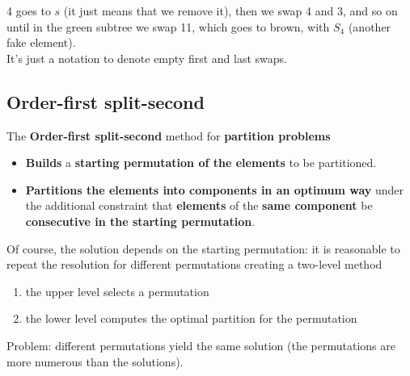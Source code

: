\documentclass[11pt]{article}
\begin{document}
	4 goes to $s$ (it just means that we remove it), then we swap 4 and 3, and so on until in the green subtree we swap 11, which goes to brown, with $S_4$ (another fake element).\\
	
	It's just a notation to denote empty first and last swaps.\\
	
	\newpage
	
	\subsection{Order-first split-second}
	
	The \textbf{Order-first split-second} method for \textbf{partition problems}
	\begin{itemize}
		\item \textbf{Builds} a \textbf{starting permutation of the elements} to be partitioned.\\
		
		\item \textbf{Partitions the elements into components in an optimum way} under the additional constraint that \textbf{elements} of the \textbf{same component} be \textbf{consecutive in the starting permutation}.\\
	\end{itemize}
	
	Of course, the solution depends on the starting permutation: it is reasonable to repeat the resolution for different permutations creating a two-level method
	\begin{enumerate}
		\item the upper level selects a permutation
		
		\item the lower level computes the optimal partition for the permutation
	\end{enumerate}
	
	Problem: different permutations yield the same solution (the permutations are more numerous than the solutions).\\
	
	
\end{document}
